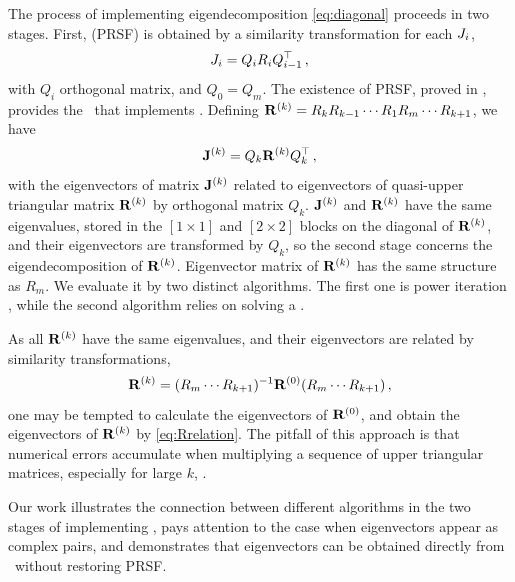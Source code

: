 \documentclass[final,leqno,onefignum,onetabnum]{siamltexmm}
\begin{document}
The process of implementing eigendecomposition \eqref{eq:diagonal}
proceeds in two stages. First, {\prsf} (PRSF) is
obtained by a similarity transformation for each $J_i$,
\begin{equation}
  \label{eq:prsf}
  \jMps_{i}=Q_{i}R_{i}Q_{i-1}^\top
  \,,
\end{equation}
with $Q_{i}$ orthogonal matrix, and $Q_{0}=Q_{m}$.
The existence of PRSF, proved in
, provides the \pqr\ that implements \psd.
Defining $\mathbf{R}^{(k)}=R_{k}R_{k-1}\cdots R_{1}R_{m}\cdots R_{k+1}$, we have
\begin{equation}
  \label{eq:pedrotation}
  \ps{\jMps}{k}=Q_{k}\ps{R}{k}Q_{k}^\top
  \,,
\end{equation}
with the eigenvectors of matrix $\mathbf{J}^{(k)}$ related to eigenvectors
of quasi-upper triangular matrix $\mathbf{R}^{(k)}$ by orthogonal matrix
$Q_{k}$. $\mathbf{J}^{(k)}$ and $\mathbf{R}^{(k)}$ have the same eigenvalues,
stored in the $[1\!\times\! 1]$ and $[2\!\times\! 2]$ blocks on the
diagonal of $\mathbf{R}^{(k)}$, and their eigenvectors are transformed by
$Q_{k}$, so the second stage concerns the eigendecomposition of
$\mathbf{R}^{(k)}$. Eigenvector matrix of $\mathbf{R}^{(k)}$ has the same structure as
$R_{m}$. We evaluate it by two distinct algorithms. The first one is power iteration
, while the
second algorithm relies on solving a \pse{}.

As all $\mathbf{R}^{(k)}$ have the same eigenvalues, and their eigenvectors are
related by similarity transformations,
\begin{equation}
  \label{eq:Rrelation}
  \ps{R}{k}=(R_{m}\cdots R_{k+1})^{-1}\ps{R}{0}(R_{m}\cdots R_{k+1})
  \,,
\end{equation}
one may be tempted to calculate the eigenvectors of $\mathbf{R}^{(0)}$, and
obtain the eigenvectors of $\mathbf{R}^{(k)}$ by \eqref{eq:Rrelation}. The
pitfall of this approach is that numerical errors accumulate when
multiplying a sequence of upper triangular matrices, especially for large
$k$, .

Our work illustrates the connection between different algorithms in the
two stages of implementing \ped, pays attention to the case when
eigenvectors appear as complex pairs, and demonstrates that eigenvectors
can be obtained directly from \pse\ without restoring PRSF.
\end{document}
